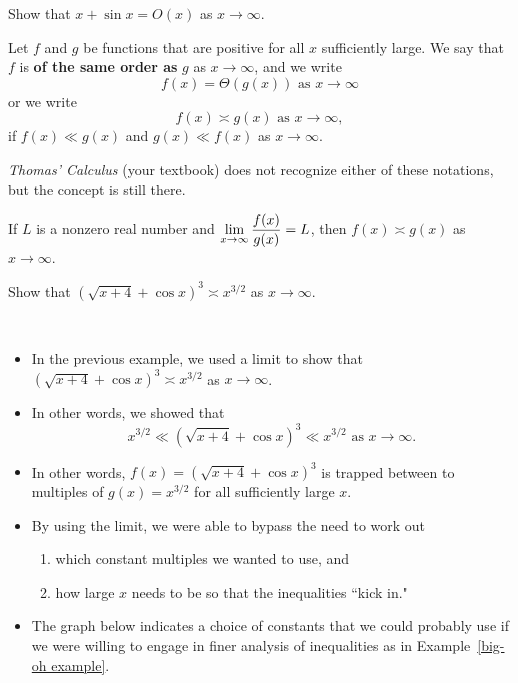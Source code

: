 \newpage

\begin{example}\label{big-oh example}
Show that $x+\sin x = O(x)$ as $x\to\infty$.
\end{example}

\newpage

\begin{definition}
Let $f$ and $g$ be functions that are positive for all $x$ sufficiently large.
We say that $f$ is \textbf{of the same order as} $g$ as $x\to \infty$, and we write
\begin{equation*}
f(x) = \Theta(g(x)) \text{ as } x\to\infty
\end{equation*}
or we write
\begin{equation*}
f(x) \asymp g(x) \text{ as } x\to \infty,
\end{equation*}
if $f(x)\ll g(x)$ and $g(x)\ll f(x)$ as $x\to \infty$.
\end{definition}

\begin{remark}
\textit{Thomas' Calculus} (your textbook) does not recognize either of these notations, but the concept is still there.
\end{remark}

\begin{theorem}
If $L$ is a nonzero real number and $\displaystyle\lim_{x\to\infty}\frac{f(x)}{g(x)} = L$, then $f(x)\asymp g(x)$ as $x\to\infty$.
\end{theorem}


\begin{example}
Show that $(\sqrt{x+4}+\cos x)^3\asymp x^{3/2}$ as $x\to\infty$.
\end{example}

\newpage

\begin{remark}\,
\begin{itemize}
\item In the previous example, we used a limit to show that $(\sqrt{x+4}+\cos x)^3\asymp x^{3/2}$ as $x\to\infty$.
\item In other words, we showed that
\begin{equation*}
x^{3/2} \ll (\sqrt{x+4}+\cos x)^3\ll x^{3/2} \text{ as } x\to\infty.
\end{equation*}
\item In other words, $f(x) = (\sqrt{x+4}+\cos x)^3$ is trapped between to multiples of $g(x)=x^{3/2}$ for all sufficiently large $x$.
\item By using the limit, we were able to bypass the need to work out
\begin{enumerate}
\item which constant multiples we wanted to use, and
\item how large $x$ needs to be so that the inequalities ``kick in."
\end{enumerate}
\item The graph below indicates a choice of constants that we could probably use if we were willing to engage in finer analysis of inequalities as in Example~\ref{big-oh example}.
\end{itemize}
\end{remark}

